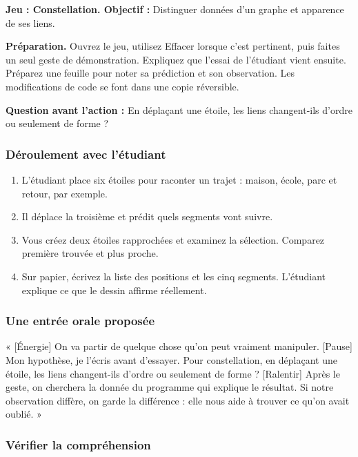 \documentclass[
  canadien,
  11pt,
  letterpaper,
]{article}
\providecommand{\tightlist}{%
  \setlength{\itemsep}{0pt}\setlength{\parskip}{0pt}}
\begin{document}
\textbf{Jeu : Constellation. Objectif :} Distinguer données d'un graphe
et apparence de ses liens.

\textbf{Préparation.} Ouvrez le jeu, utilisez Effacer lorsque c'est
pertinent, puis faites un seul geste de démonstration. Expliquez que
l'essai de l'étudiant vient ensuite. Préparez une feuille pour noter sa
prédiction et son observation. Les modifications de code se font dans
une copie réversible.

\textbf{Question avant l'action :} En déplaçant une étoile, les liens
changent-ils d'ordre ou seulement de forme ?

\subsubsection{Déroulement avec
l'étudiant}\label{duxe9roulement-avec-luxe9tudiant-6}

\begin{enumerate}
\def\labelenumi{\arabic{enumi}.}
\tightlist
\item
  L'étudiant place six étoiles pour raconter un trajet : maison, école,
  parc et retour, par exemple.
\item
  Il déplace la troisième et prédit quels segments vont suivre.
\item
  Vous créez deux étoiles rapprochées et examinez la sélection. Comparez
  première trouvée et plus proche.
\item
  Sur papier, écrivez la liste des positions et les cinq segments.
  L'étudiant explique ce que le dessin affirme réellement.
\end{enumerate}

\subsubsection{Une entrée orale
proposée}\label{une-entruxe9e-orale-proposuxe9e-6}

« {[}Énergie{]} On va partir de quelque chose qu'on peut vraiment
manipuler. {[}Pause{]} Mon hypothèse, je l'écris avant d'essayer. Pour
constellation, en déplaçant une étoile, les liens changent-ils d'ordre
ou seulement de forme ? {[}Ralentir{]} Après le geste, on cherchera la
donnée du programme qui explique le résultat. Si notre observation
diffère, on garde la différence : elle nous aide à trouver ce qu'on
avait oublié. »

\subsubsection{Vérifier la
compréhension}\label{vuxe9rifier-la-compruxe9hension-6}
\end{document}
